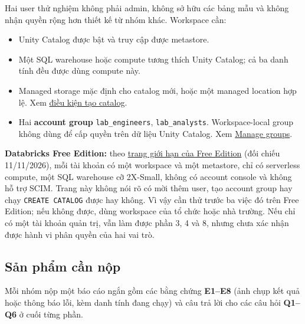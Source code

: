 Hai user thử nghiệm không phải admin, không sở hữu các bảng mẫu và không nhận quyền rộng hơn thiết kế từ nhóm khác. Workspace cần:


\begin{itemize}
\item Unity Catalog được bật và truy cập được metastore.
\item Một SQL warehouse hoặc compute tương thích Unity Catalog; cả ba danh tính đều được dùng compute này.
\item Managed storage mặc định cho catalog mới, hoặc một managed location hợp lệ. Xem \href{https://docs.databricks.com/aws/en/catalogs/create-catalog}{điều kiện tạo catalog}.
\item Hai \textbf{account group} \texttt{lab\_\allowbreak{}engineers}, \texttt{lab\_\allowbreak{}analysts}. Workspace-local group không dùng để cấp quyền trên dữ liệu Unity Catalog. Xem \href{https://docs.databricks.com/aws/en/admin/users-groups/manage-groups}{Manage groups}.
\end{itemize}

\begin{notebox}
\textbf{Databricks Free Edition:} theo \href{https://docs.databricks.com/aws/en/getting-started/free-edition-limitations}{trang giới hạn của Free Edition} (đối chiếu 11/11/2026), mỗi tài khoản có một workspace và một metastore, chỉ có serverless compute, một SQL warehouse cỡ 2X-Small, không có account console và không hỗ trợ SCIM. Trang này không nói rõ có mời thêm user, tạo account group hay chạy \texttt{CREATE CATALOG} được hay không. Vì vậy cần thử trước ba việc đó trên Free Edition; nếu không được, dùng workspace của tổ chức hoặc nhà trường. Nếu chỉ có một tài khoản quản trị, vẫn làm được phần 3, 4 và 8, nhưng chưa xác nhận được hành vi phân quyền của hai vai trò.
\end{notebox}

\subsection{Sản phẩm cần nộp}

Mỗi nhóm nộp một báo cáo ngắn gồm các bằng chứng \textbf{E1--E8} (ảnh chụp kết quả hoặc thông báo lỗi, kèm danh tính đang chạy) và câu trả lời cho các câu hỏi \textbf{Q1--Q6} ở cuối từng phần.


